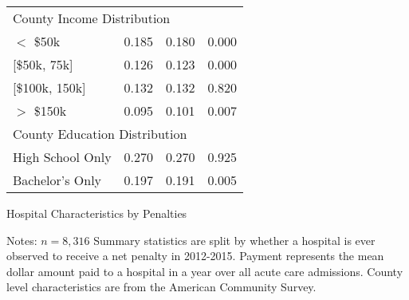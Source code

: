 \documentclass[12pt]{article}
\begin{document}
{\begin{tabular}{lccc}
\multicolumn{4}{l}{County Income Distribution}\\							
\hspace{0.05in}$<$ \$50k   	&	0.185	&	0.180	&	0.000	\\
\hspace{0.05in}[\$50k, 75k]   	&	0.126	&	0.123	&	0.000	\\
\hspace{0.05in}[\$100k, 150k]       	&	0.132	&	0.132	&	0.820	\\
\hspace{0.05in}$>$ \$150k   	&	0.095	&	0.101	&	0.007	\\
\multicolumn{4}{l}{County Education Distribution}\\							
\hspace{0.05in}High School Only  	&	0.270	&	0.270	&	0.925	\\
\hspace{0.05in}Bachelor's Only    	&	0.197	&	0.191	&	0.005	\\
\hline
\end{tabular}
}
\setlength{\captionmargin}{.5 \textwidth} \addtolength{\captionmargin}{-.5\wd\gfxbox}
\begin{table}[!h]
\centering
\caption{Hospital Characteristics by Penalties}
\label{tab:bypenalty}
\usebox{\gfxbox}
\par
\begin{minipage}{\wd\gfxbox}
\footnotesize
Notes:  $n=8,316$ Summary statistics are split by whether a hospital is ever observed to receive a net penalty in 2012-2015. Payment represents the mean dollar amount paid to a hospital in a year over all acute care admissions.   County level characteristics are from the American Community Survey.
\end{minipage}
\end{table}
\end{document}
